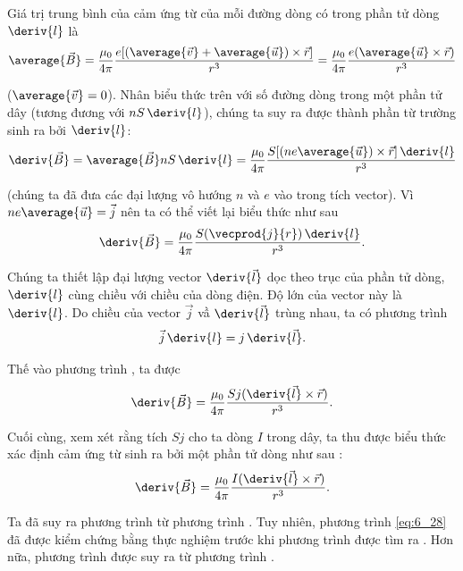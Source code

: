 Giá trị trung bình của cảm ứng từ của mỗi đường dòng có trong phần tử dòng $\deriv{l}$ là
\begin{equation*}
    \average{\vec{B}} = \frac{\mu_0}{4\pi} \frac{e [(\average{\vec{v}} + \average{\vec{u}}) \times \vec{r}]}{r^3} = \frac{\mu_0}{4\pi} \frac{e (\average{\vec{u}} \times \vec{r})}{r^3}
\end{equation*}

\noindent
($\average{\vec{v}}=0$). Nhân biểu thức trên với số đường dòng trong một phần tử dây (tương đương với $nS\, \deriv{l}$), chúng ta suy ra được thành phần từ trường sinh ra bởi $\deriv{l}$:
\begin{equation*}
    \deriv{\vec{B}} = \average{\vec{B}} n S\, \deriv{l} = \frac{\mu_0}{4\pi} \frac{S [(ne\average{\vec{u}}) \times \vec{r}]\, \deriv{l}}{r^3}
\end{equation*}

\noindent
(chúng ta đã đưa các đại lượng vô hướng $n$ và $e$ vào trong tích vector). Vì $ne\average{\vec{u}}=\vec{j}$ nên ta có thể viết lại biểu thức như sau
\begin{equation}\label{eq:6_26}
    \deriv{\vec{B}} = \frac{\mu_0}{4\pi} \frac{S (\vecprod{j}{r})\, \deriv{l}}{r^3}.
\end{equation}

Chúng ta thiết lập đại lượng vector $\deriv{\vec{l}}$ dọc theo trục của phần tử dòng, $\deriv{l}$ cùng chiều với chiều của dòng điện. Độ lớn của vector này là $\deriv{l}$. Do chiều của vector $\vec{j}$ vầ $\deriv{\vec{l}}$ trùng nhau, ta có phương trình 
\begin{equation}\label{eq:6_27}
    \vec{j}\, \deriv{l} = j\, \deriv{\vec{l}}.
\end{equation}

\noindent
Thế vào phương trình , ta được
\begin{equation*}
    \deriv{\vec{B}} = \frac{\mu_0}{4\pi} \frac{S j (\deriv{\vec{l}}\times\vec{r})}{r^3}.
\end{equation*}

\noindent
Cuối cùng, xem xét rằng tích $Sj$ cho ta dòng  $I$ trong dây, ta thu được biểu thức xác định cảm ứng từ sinh ra bởi một phần tử dòng như sau :
\begin{equation}\label{eq:6_28}
    \deriv{\vec{B}} = \frac{\mu_0}{4\pi} \frac{I (\deriv{\vec{l}}\times\vec{r})}{r^3}.
\end{equation}

Ta đã suy ra phương trình  từ phương trình . Tuy nhiên, phương trình \eqref{eq:6_28} đã được kiểm chứng bằng thực nghiệm trước khi phương trình  được tìm ra . Hơn nữa, phương trình  được suy ra từ phương trình .

